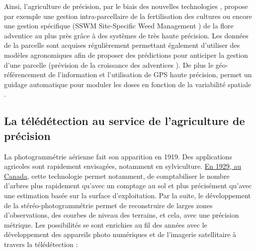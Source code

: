 \documentclass[../thesis.tex]{subfiles}
\begin{document}
    Ainsi, l'agriculture de précision, par le biais des nouvelles technologies \cite{app11135911}, propose par exemple une gestion intra-parcellaire de la fertilisation des cultures ou encore une gestion spécifique (SSWM Site-Specific Weed Management \cite{lopez2011weed}) de la flore adventice au plus près grâce à des systèmes de très haute précision. Les données de la parcelle sont acquises régulièrement permettant également d'utiliser des modèles agronomiques afin de proposer des prédictions pour anticiper la gestion d'une parcelle (prévision de la croissance des adventices \cite{9448338}). De plus le géo-référencement de l'information et l'utilisation de GPS haute précision, permet un guidage automatique pour moduler les doses en fonction de la variabilité spatiale \cite{PEREZRUIZ2021299}. %
    
    \newpage
    
    \subsection{La télédétection au service de l'agriculture de précision}
    
    La photogrammétrie aérienne fait son apparition en 1919. Des applications agricoles sont rapidement envisagées, notamment en sylviculture. \href{http://www.fao.org/3/x5339f07.htm}{En 1929, au Canada}, cette technologie permet notamment, de comptabiliser le nombre d'arbres plus rapidement qu'avec un comptage au sol et plus précisément qu'avec une estimation basée sur la surface d'exploitation. Par la suite, le développement de la stéréo-photogrammétrie permet de reconstruire de larges zones d'observations, des courbes de niveau des terrains, et cela, avec une précision métrique. Les possibilités se sont enrichies au fil des années avec le développement des appareils photo numériques et de l'imagerie satellitaire à travers la télédétection :
    
\end{document}
